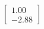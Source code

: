\documentclass[preview]{standalone}
\begin{document}
\begin{align*}
\begin{bmatrix} 1.00 \\ -2.88 \end{bmatrix}
\end{align*}
\end{document}
